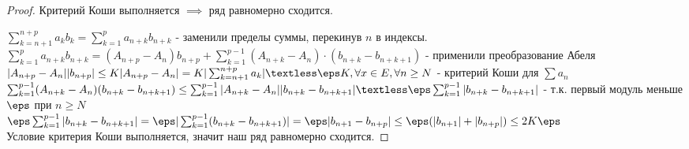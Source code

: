 \begin{statement}
\begin{proof}
        Критерий Коши выполняется $\implies$ ряд равномерно сходится.

		$\sum^{n+p}_{k = n+1} a_k b_k = \sum^p_{k = 1} a_{n+k} b_{n+k}$ - заменили пределы суммы, перекинув $n$ в индексы. \\
		$\sum^p_{k = 1} a_{n+k} b_{n+k} = (A_{n+p} - A_n)b_{n+p} + \sum^{p-1}_{k = 1}(A_{n+k} - A_n)\cdot(b_{n+k} - b_{n+k+1})$
		 - применили преобразование Абеля \\
		$|A_{n+p} - A_n||b_{n+p}| \leq K|A_{n+p} - A_n| = K|\sum^{n+p}_{k = n+1} a_k| \textless \eps K, \forall{x \in E}, \forall{n \geq N}$ - критерий Коши для $\sum a_n$ \\
		$\sum^{p - 1}_{k = 1}(A_{n+k} - A_n)(b_{n+k} - b_{n+k+1}) \leq \sum^{p-1}_{k = 1}|A_{n+k} - A_n||b_{n+k} - b_{n+k+1}| \textless \eps\sum^{p-1}_{k = 1}|b_{n+k} - b_{n+k+1}|$ - т.к. первый модуль меньше $\eps$ при $n \geq N$\\
		$\eps\sum^{p-1}_{k = 1}|b_{n+k} - b_{n+k+1}| = \eps|\sum^{p-1}_{k = 1}(b_{n+k} - b_{n+k+1})| = \eps|b_{n+1} - b_{n+p}| \leq \eps(|b_{n+1}| + |b_{n+p}|) \leq 2K\eps$ \\
		Условие критерия Коши выполняется, значит наш ряд равномерно сходится.
	\end{proof}
\end{statement}
